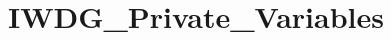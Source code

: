 \hypertarget{group___i_w_d_g___private___variables}{}\section{I\+W\+D\+G\+\_\+\+Private\+\_\+\+Variables}
\label{group___i_w_d_g___private___variables}
